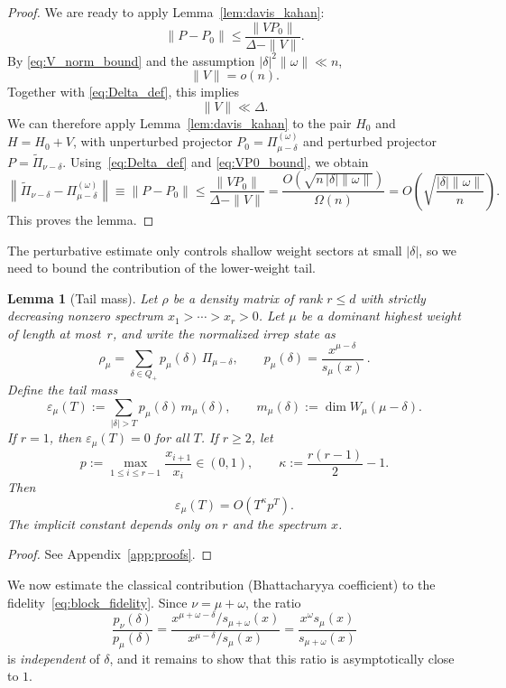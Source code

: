\documentclass[a4paper,onecolumn,11pt]{quantumarticle}
\newtheorem{lem}{Lemma}
\begin{document}
\begin{proof}
We are ready to apply Lemma~\ref{lem:davis_kahan}:
$$ \|P-P_0\|\le \frac{\|VP_0\|}{\Delta-\|V\|} .$$
By \eqref{eq:V_norm_bound} and the assumption \(|\delta|^2\|\omega\|\ll n\),
\[
\|V\|=o(n).
\]
Together with \eqref{eq:Delta_def}, this implies
\[
\|V\|\ll \Delta.
\]
We can therefore apply Lemma~\ref{lem:davis_kahan} to the pair \(H_0\) and \(H=H_0+V\), with unperturbed projector \(P_0=\Pi_{\mu-\delta}^{(\omega)}\) and perturbed projector \(P=\widetilde{\Pi}_{\nu-\delta}\). Using~\eqref{eq:Delta_def} and \eqref{eq:VP0_bound}, we obtain
\begin{equation}
    \left\|\widetilde{\Pi}_{\nu-\delta}-\Pi_{\mu-\delta}^{(\omega)}\right\|\equiv\|P-P_0\|
    \le \frac{\|VP_0\|}{\Delta-\|V\|} 
    = \frac{O\!\left(\sqrt{n\,|\delta| \|\omega\|}\right)}{\Omega(n)} 
    = O\!\left(\sqrt{\frac{|\delta| \|\omega\|}{n}}\right).
\end{equation}
This proves the lemma.
\end{proof}

The perturbative estimate only controls shallow weight sectors at small $|\delta|$, so we need to bound the contribution of the lower-weight tail.

\begin{lem}[Tail mass]\label{lem:tail}
Let \(\rho\) be a density matrix of rank \(r\le d\) with strictly decreasing nonzero spectrum \(x_1>\cdots>x_r>0\).
Let \(\mu\) be a dominant highest weight of length at most~\(r\), and write the normalized irrep state as
\[
    \rho_\mu =
    \sum_{\delta\in Q_+} p_\mu(\delta)\,\Pi_{\mu-\delta},
    \qquad
    p_\mu(\delta)=\frac{x^{\mu-\delta}}{s_\mu(x)}\ .
\]
Define the tail mass
\begin{equation}
    \varepsilon_\mu(T) := 
    \sum_{|\delta|>T} p_\mu(\delta)\,m_\mu(\delta),
    \qquad
    m_\mu(\delta):= \dim W_\mu(\mu-\delta).
\end{equation}
If \(r=1\), then \(\varepsilon_\mu(T)=0\) for all \(T\).
If \(r\ge 2\), let
\[
    p:= \max_{1\le i\le r-1}\frac{x_{i+1}}{x_i}\in (0,1),
    \qquad
    \kappa:= \frac{r(r-1)}2-1.
\]
Then
\begin{equation}
    \varepsilon_\mu(T)=O\!\left(T^\kappa p^T\right).
\end{equation}
The implicit constant depends only on \(r\) and the spectrum \(x\).
\end{lem}
\begin{proof}
    See Appendix~\ref{app:proofs}.
\end{proof}


We now estimate the classical contribution (Bhattacharyya coefficient) to the fidelity~\eqref{eq:block_fidelity}. Since \(\nu=\mu+\omega\), the ratio 
\begin{equation}
    \frac{p_\nu(\delta)}{p_\mu(\delta)}=\frac{x^{\mu+\omega-\delta}/s_{\mu+\omega}(x)}{x^{\mu-\delta}/s_{\mu}(x)} = \frac{x^\omega s_\mu(x)}{s_{\mu+\omega}(x)}
\end{equation}
is \emph{independent} of \(\delta\), and it remains to show that this ratio is asymptotically close to \(1\).
\end{document}
